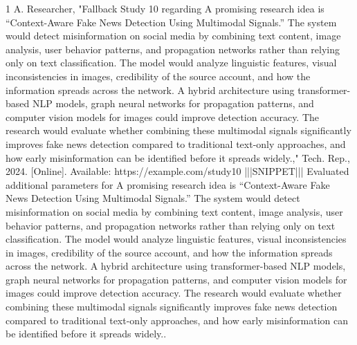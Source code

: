 \documentclass[conference]{IEEEtran}
\begin{document}
\begin{thebibliography}{1}
A. Researcher, "Fallback Study 10 regarding A promising research idea is “Context-Aware Fake News Detection Using Multimodal Signals.” The system would detect misinformation on social media by combining text content, image analysis, user behavior patterns, and propagation networks rather than relying only on text classification. The model would analyze linguistic features, visual inconsistencies in images, credibility of the source account, and how the information spreads across the network. A hybrid architecture using transformer-based NLP models, graph neural networks for propagation patterns, and computer vision models for images could improve detection accuracy. The research would evaluate whether combining these multimodal signals significantly improves fake news detection compared to traditional text-only approaches, and how early misinformation can be identified before it spreads widely.," Tech. Rep., 2024. [Online]. Available: https://example.com/study10 |||SNIPPET||| Evaluated additional parameters for A promising research idea is “Context-Aware Fake News Detection Using Multimodal Signals.” The system would detect misinformation on social media by combining text content, image analysis, user behavior patterns, and propagation networks rather than relying only on text classification. The model would analyze linguistic features, visual inconsistencies in images, credibility of the source account, and how the information spreads across the network. A hybrid architecture using transformer-based NLP models, graph neural networks for propagation patterns, and computer vision models for images could improve detection accuracy. The research would evaluate whether combining these multimodal signals significantly improves fake news detection compared to traditional text-only approaches, and how early misinformation can be identified before it spreads widely..

\end{thebibliography}
\end{document}
